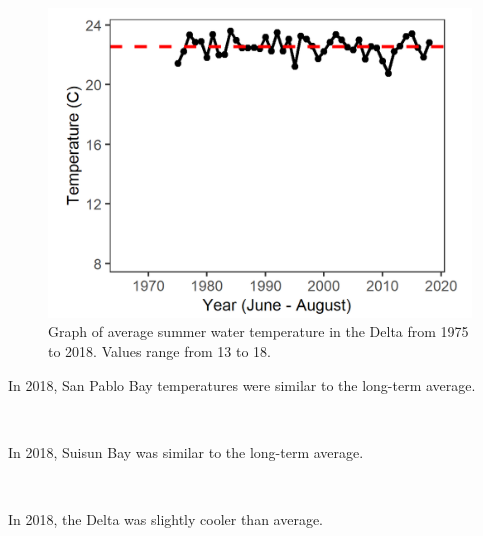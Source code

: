 \documentclass[
]{book}
\begin{document}
\begin{panel-grid}
\begin{columns-nocenter}
\begin{column800}
\begin{expand}
\begin{figure}
\includegraphics[width=15.25in]{figures/temp_dtsummer} \caption{Graph of average summer water temperature in the Delta from 1975 to 2018. Values range from 13 to 18.}\label{fig:unnamed-chunk-59}
\end{figure}

\end{expand}

\end{column800}

\end{columns-nocenter}

\begin{columns-nocenter}

\begin{column800}

In 2018, San Pablo Bay temperatures were similar to the long-term average.

\end{column800}

\begin{column40}

~

\end{column40}

\begin{column800}

In 2018, Suisun Bay was similar to the long-term average.

\end{column800}

\begin{column40}

~

\end{column40}

\begin{column800}

In 2018, the Delta was slightly cooler than average.

\end{column800}

\end{columns-nocenter}

\end{panel-grid}
\end{document}
